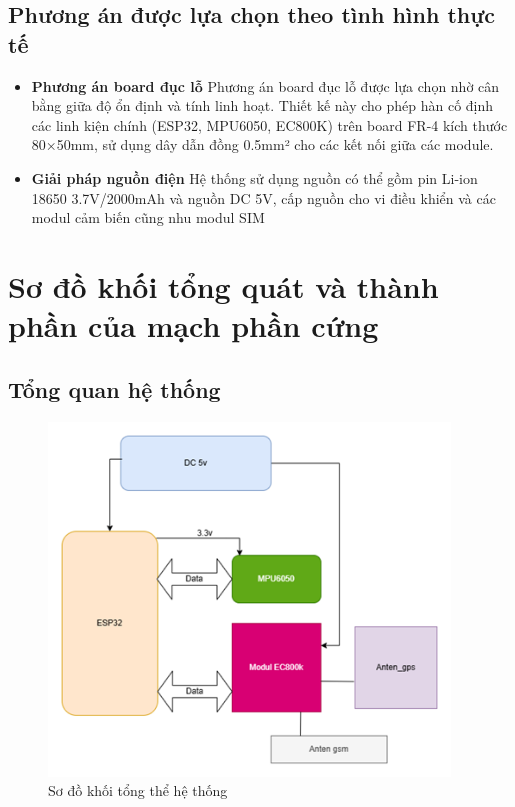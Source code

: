 \documentclass[a4paper,12pt]{report}
\begin{document}
	\subsection{Phương án được lựa chọn theo tình hình thực tế}
	
	\begin{itemize}
		\item \textbf{ Phương án board đục lỗ }
		Phương án board đục lỗ được lựa chọn nhờ cân bằng giữa độ ổn định và tính linh hoạt. Thiết kế này cho phép hàn cố định các linh kiện chính (ESP32, MPU6050, EC800K) trên board FR-4 kích thước 80×50mm, sử dụng dây dẫn đồng 0.5mm² cho các kết nối giữa các module.
		\item \textbf{Giải pháp nguồn điện}   
		Hệ thống sử dụng nguồn có thể gồm pin Li-ion 18650 3.7V/2000mAh và nguồn DC 5V, cấp nguồn cho vi điều khiển và các modul cảm biến cũng nhu modul SIM
	\end{itemize}
	
	
	\section{Sơ đồ khối tổng quát và thành phần của mạch phần cứng}
	
	\subsection{Tổng quan hệ thống}
	\begin{figure}[H]
		\centering
		\includegraphics[width=0.95\textwidth]{SYSTEM_DIAGRAM.png}
		\caption{Sơ đồ khối tổng thể hệ thống}
		\label{fig:system_block}
	\end{figure}
	
\end{document}
